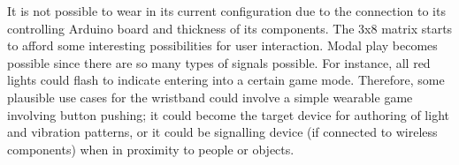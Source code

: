 \documentclass{chi-ext}
\begin{document}
It is not possible to wear in its current configuration due to the connection to its controlling Arduino board and thickness of its components.  The 3x8 matrix starts to afford some interesting possibilities for user interaction. Modal play becomes possible since there are so many types of signals possible. For instance, all red lights could flash to indicate entering into a certain game mode. Therefore, some plausible use cases for the wristband could involve a simple wearable game involving button pushing; it could become the target device for authoring of light and vibration patterns, or it could be signalling device (if connected to wireless components) when in proximity to people or objects.


\end{document}
